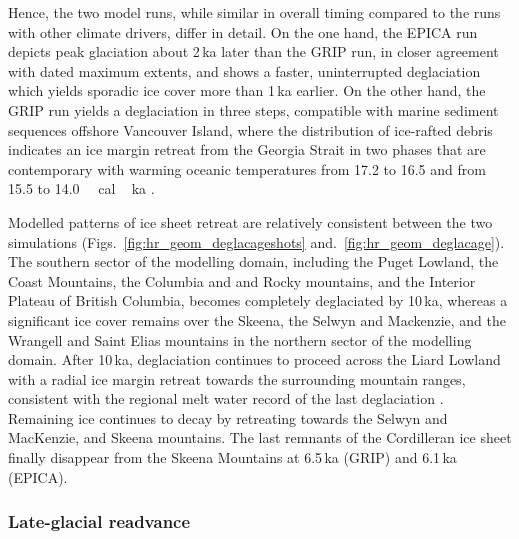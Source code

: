 \documentclass[tc, manuscript]{copernicus}
\begin{document}
Hence, the two model runs, while similar in overall timing compared to the runs
with other climate drivers, differ in detail. On the one hand, the EPICA run
depicts peak glaciation about 2\,ka later than the GRIP run, in closer
agreement with dated maximum extents, and shows a faster, uninterrupted
deglaciation which yields sporadic ice cover more than 1\,ka earlier. On the
other hand, the GRIP run yields a deglaciation in three steps, compatible with
marine sediment sequences offshore Vancouver Island, where the distribution of
ice-rafted debris indicates an ice margin retreat from the Georgia Strait in two
phases that are contemporary with warming oceanic temperatures from 17.2 to
16.5 and from 15.5 to 14.0\,\unit{\,cal\,ka}
\citep{Taylor.etal.2014}.

Modelled patterns of ice sheet retreat are relatively consistent between the
two simulations (Figs.~\ref{fig:hr_geom_deglacageshots} and.~\ref{fig:hr_geom_deglacage}). The
southern sector of the modelling domain, including the Puget Lowland, the Coast
Mountains, the Columbia and
and Rocky mountains, and the Interior Plateau of British Columbia, becomes
completely deglaciated by 10\,ka, whereas a significant ice cover remains over
the Skeena, the Selwyn and Mackenzie, and the Wrangell and Saint Elias mountains in the
northern sector of the modelling domain. After 10\,ka, deglaciation continues
to proceed across the Liard Lowland with a radial ice margin retreat towards
the surrounding mountain ranges, consistent with the regional melt water record
of the last deglaciation \citep{Margold.etal.2013}. Remaining ice continues to
decay by retreating towards the Selwyn and MacKenzie, and Skeena mountains.
The last remnants
of the Cordilleran ice sheet finally disappear from the Skeena Mountains at
6.5\,ka (GRIP) and 6.1\,ka (EPICA).

\subsubsection{Late-glacial readvance}
\end{document}
